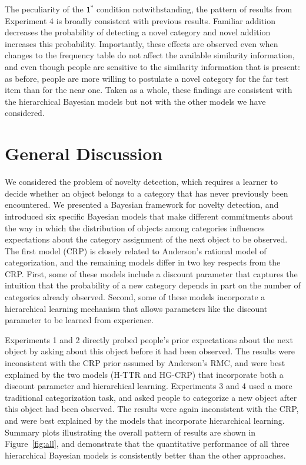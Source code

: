\documentclass[doc]{apa6}
\newcommand{\dist}[1]{\texttt{#1}}
\begin{document}
The peculiarity of the \dist{1$^*$} condition notwithstanding, the pattern of results from Experiment 4 is broadly consistent with previous results. Familiar addition decreases the probability of detecting a novel category and novel addition increases this probability. Importantly, these effects are observed even when changes to the frequency table do not affect the available similarity information, and even though people are sensitive to the similarity information that is present: as before, people are more willing to postulate a novel category for the far test item than for the near one. Taken as a whole, these findings are consistent with the hierarchical Bayesian models but not with the other models we have considered.


\section{General Discussion}

We considered the problem of novelty detection, which requires a learner to decide whether an object belongs to a category that has never previously been encountered. We presented a Bayesian framework for novelty detection, and introduced six specific Bayesian models that make different commitments about the way in which  the distribution of objects among categories influences expectations about the category assignment of the next object to be observed. The first model (CRP) is closely related to Anderson's rational model of categorization, and the remaining models differ in two key respects from the CRP. First, some of these models include a discount parameter that captures the intuition that the probability of a new category depends in part on the number of categories already observed. Second, some of these models incorporate a hierarchical learning mechanism that allows parameters like the discount parameter to be learned from experience.

Experiments 1 and 2 directly probed people's prior expectations about the next object by asking about this object before it had been observed. The results were inconsistent with the CRP prior assumed by Anderson's RMC, and were best explained by the two models (H-TTR and HG-CRP) that incorporate both a discount parameter and hierarchical learning.  Experiments 3 and 4 used a more traditional categorization task, and asked people to categorize a new object after this object had been observed. The results were again inconsistent with the CRP, and were best explained by the models that incorporate hierarchical learning. Summary plots illustrating the overall pattern of results are shown in Figure~\ref{fig:all}, and demonstrate that the quantitative performance of all three hierarchical Bayesian models is consistently better than the other approaches.
\end{document}
